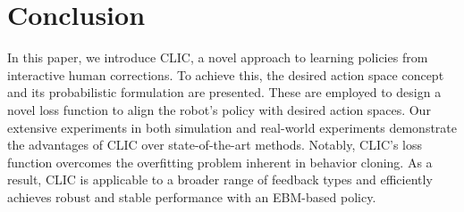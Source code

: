 

\section{Conclusion} 
\label{sec:conclusion}

In this paper, we introduce CLIC, a novel approach to learning policies from interactive human corrections. 
To achieve this, the desired action space concept and its probabilistic formulation are presented. 
These are employed to design a novel loss function to align the robot's policy with desired action spaces.
Our extensive experiments in both simulation and real-world experiments demonstrate the advantages of CLIC over state-of-the-art methods. 
 Notably, CLIC's loss function overcomes the overfitting problem inherent in behavior cloning. 
 As a result, CLIC is applicable to a broader range of feedback types and efficiently achieves robust and stable performance with an EBM-based policy.


